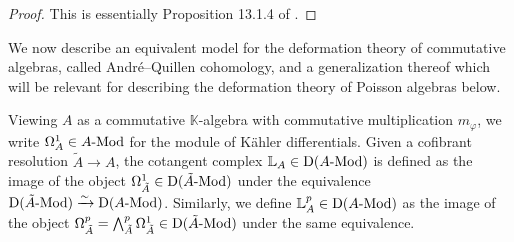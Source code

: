 \documentclass[11pt]{amsart}
\numberwithin{equation}{section}
\theoremstyle{definition}
\newtheorem{rmk}[theo]{Remark}
\newcommand{\bb}{\mathbb}
\newcommand{\mc}{\mathcal}
\newcommand{\mf}{\mathfrak}
\newcommand{\bL}{{\mathbb{L}}}
\DeclareMathOperator{\Hom}{Hom}
\newcommand{\Mod}{{\textup{-Mod}}}
\newcommand{\K}{{\bb K}}
\newcommand{\ik}{{\bb K}}
\newcommand{\End}{{\textup{End}}}
\newcommand{\Sh}{{\textup{Sh}}}
\newcommand{\Comm}{{\textup{Comm}}}
\newcommand{\Lie}{{\textup{Lie}}}
\newcommand{\ash}{{\textup{\mbox{!`}}}}
\newcommand{\Ass}{{\textup{Ass}}}
\newcommand{\Ss}{{{\mf{S}}}}
\newcommand{\0}{{\textbf{0}}}
\newcommand{\Dd}{{\textup{D}}}
\newcommand{\g}{{\mf{g}}}
\def \mf{\mathfrak}
\begin{document}
\begin{proof} 
This is essentially Proposition 13.1.4 of \cite{LV}.
\end{proof}




%


We now describe an equivalent model for the deformation theory of commutative algebras, called Andr\'e--Quillen cohomology, and a generalization thereof which will be relevant for describing the deformation theory of Poisson algebras below.


Viewing $A$ as a commutative $\ik$-algebra with commutative multiplication $m_\varphi$, we write $\Omega^1_A\in A\Mod$ for the module of K\"ahler differentials. Given a cofibrant resolution $\tilde A \to A$, the cotangent complex $\bL_A\in\Dd(A\Mod)$ is defined as the image of the object $\Omega^1_{\tilde A}\in \Dd(\tilde A\Mod)$ under the equivalence $\Dd(\tilde A\Mod)\xrightarrow{\sim}\Dd(A\Mod)$. Similarly, we define $\bL^p_A\in \Dd(A \Mod)$ as the image of the object $\Omega^p_{\tilde A} = \bigwedge_{\tilde A}^p \Omega^1_{\tilde A}\in \Dd(\tilde A\Mod)$ under the same equivalence.
\end{document}
